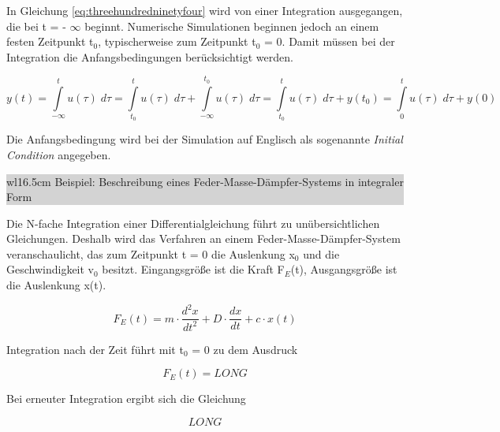 \noindent In Gleichung \eqref{eq:threehundredninetyfour} wird von einer Integration ausgegangen, die bei t = - $\mathrm{\infty}$ beginnt. Numerische Simulationen beginnen jedoch an einem festen Zeitpunkt t${}_{0}$, typischerweise zum Zeitpunkt t${}_{0}$ = 0. Damit m\"{u}ssen bei der Integration die Anfangsbedingungen ber\"{u}cksichtigt werden. 

\begin{equation}\label{eq:threehundredninetyfive}
y\left(t\right)=\int\limits _{-\infty }^{t}u\left(\tau \right) \; d\tau =\int\limits _{t_{0} }^{t}u\left(\tau \right) \; d\tau +\int\limits _{-\infty }^{t_{0} }u\left(\tau \right) \; d\tau =\int\limits _{t_{0} }^{t}u\left(\tau \right) \; d\tau +y(t_{0} )=\int\limits _{0}^{t}u\left(\tau \right) \; d\tau +y(0)
\end{equation}

\noindent Die Anfangsbedingung wird bei der Simulation auf Englisch als sogenannte \textit{Initial Condition} angegeben.\bigskip

\noindent
\colorbox{lightgray}{%
%
\renewcommand\arraystretch{0.6}%
\begin{tabular}{ wl{16.5cm} }
{\selectfont
\noindent
Beispiel: Beschreibung eines Feder-Masse-Dämpfer-Systems in integraler Form}
\end{tabular}%
}\bigskip

\noindent Die N-fache Integration einer Differentialgleichung f\"{u}hrt zu un\"{u}bersichtlichen Gleichungen. Deshalb wird das Verfahren an einem Feder-Masse-D\"{a}mpfer-System veranschaulicht, das zum Zeitpunkt t = 0 die Auslenkung x${}_{0}$ und die Geschwindigkeit v${}_{0}$ besitzt. Eingangsgr\"{o}{\ss}e ist die Kraft F${}_{E}$(t), Ausgangsgr\"{o}{\ss}e ist die Auslenkung x(t). 

\begin{equation}\label{eq:threehundredninetysix}
F_{E} \left(t\right)=m\cdot \frac{d^{2} x}{dt^{2} } +D\cdot \frac{dx}{dt} +c\cdot x\left(t\right)
\end{equation}

\noindent Integration nach der Zeit f\"{u}hrt mit t${}_{0}$ = 0 zu dem Ausdruck

\begin{equation}\label{eq:threehundredninetyseven}
F_{E} \left(t\right)= LONG
\end{equation}

\noindent Bei erneuter Integration ergibt sich die Gleichung 

\begin{equation}\label{eq:threehundredninetyeight}
LONG
\end{equation}

